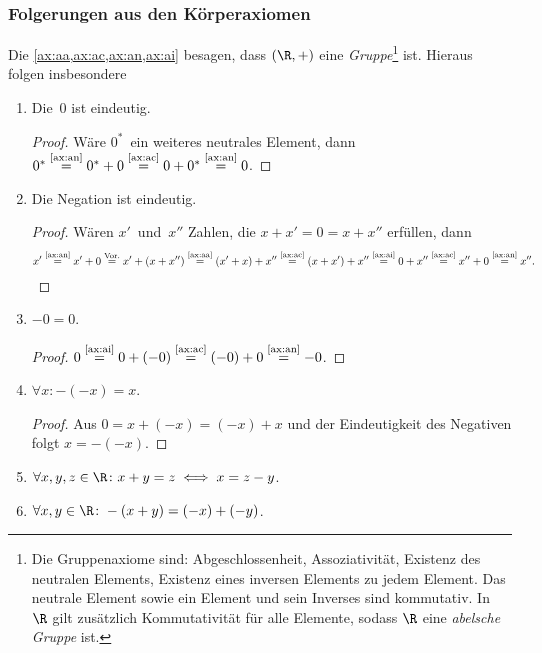 \documentclass[a4paper]{article}
\begin{document}
\subsubsection{Folgerungen aus den Körperaxiomen}

Die \cref{ax:aa,ax:ac,ax:an,ax:ai} besagen, dass $(\R,+)$ eine \emph{Gruppe}\footnote{Die Gruppenaxiome sind: Abgeschlossenheit, Assoziativität, Existenz des neutralen Elements, Existenz eines inversen Elements zu jedem Element. Das neutrale Element sowie ein Element und sein Inverses sind kommutativ. In~$\R$ gilt zusätzlich Kommutativität für alle Elemente, sodass $\R$ eine \emph{abelsche Gruppe} ist.} ist. Hieraus folgen insbesondere
\begin{enumerate}[label=\textnormal{(\alph*)}, leftmargin=*, widest=(m), series=conclusions]
    \item Die~0 ist eindeutig.
          \begin{proof}
              Wäre $0^*$~ein weiteres neutrales Element, dann $0^* \overset{\text{\ref{ax:an}}}{=} 0^* + 0 \overset{\text{\ref{ax:ac}}}{=} 0 + 0^* \overset{\text{\ref{ax:an}}}{=} 0$.
          \end{proof}
    \item Die Negation ist eindeutig.
          \begin{proof}
              Wären $x'$~und~$x''$ Zahlen, die $x + x' = 0 = x + x''$ erfüllen, dann
              \begin{equation*}
                  x' \overset{\text{\ref{ax:an}}}{=} x' + 0 \overset{\text{Vor.}}{=} x' + (x + x'') \overset{\text{\ref{ax:aa}}}{=} (x' + x) + x'' \overset{\text{\ref{ax:ac}}}{=} (x + x') + x'' \overset{\text{\ref{ax:ai}}}{=} 0 + x'' \overset{\text{\ref{ax:ac}}}{=} x'' + 0 \overset{\text{\ref{ax:an}}}{=} x''.\qedhere
              \end{equation*}
          \end{proof}
    \item $-0 = 0$.
          \begin{proof}
              $0 \overset{\text{\ref{ax:ai}}}{=} 0 + (-0) \overset{\text{\ref{ax:ac}}}{=} (-0) + 0 \overset{\text{\ref{ax:an}}}{=} -0$.
          \end{proof}
    \item $\forall x\colon - (-x) = x$.
          \begin{proof}
              Aus $0 = x + (-x) = (-x) + x$ und der Eindeutigkeit des Negativen folgt $x = - (-x)$.
          \end{proof}
    \item $\forall x, y, z \in \R\colon x + y = z \iff x = z - y$.\label{ax:addequiv}
    \item $\forall x, y \in \R\colon -(x + y) = (-x) + (-y)$.
\end{enumerate}
\end{document}

